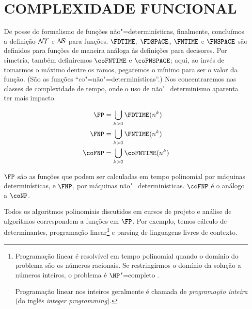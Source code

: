 \section{COMPLEXIDADE FUNCIONAL}
\label{sec:functional_complexity}

De posse do formalismo de funções não"=determinísticas,
finalmente,
concluímos a definição ${\mathcal{N\!T}}$ e ${\mathcal{N\!\!S}}$ para funções.
$\FDTIME$, $\FDSPACE$, $\FNTIME$ e $\FNSPACE$
são definidos para funções de maneira análoga às definições para decisores.
Por simetria, também definiremos $\coFNTIME$ e $\coFNSPACE$;
aqui, ao invés de tomarmos o máximo dentre os ramos,
pegaremos o mínimo para ser o valor da função.
(São as funções ``co"=não"=determinísticas''.)
Nos concentraremos nas classes de complexidade de tempo,
onde o uso de não"=determinismo aparenta ter mais impacto.

\begin{definition}
    \begin{align*}
        \FP &= \bigcup_{k > 0} \FDTIME(n^k) \\
        \FNP &= \bigcup_{k > 0} \FNTIME(n^k) \\
        \coFNP &= \bigcup_{k > 0} \coFNTIME(n^k)
    \end{align*}
\end{definition}

$\FP$ são as funções que podem ser calculadas
em tempo polinomial por máquinas determinísticas,
e $\FNP$, por máquinas não"=determinísticas.\footnotemark
$\coFNP$ é o análogo a $\coNP$.

\begin{example}
    Todos os algoritmos polinomiais
    discutidos em cursos de projeto e análise de algoritmos
    correspondem a funções em $\FP$.
    Por exemplo,
    temos cálculo de determinantes,
    programação linear\footnote{
        Programação linear é resolvível em tempo polinomial
        quando o domínio do problema são os números racionais.
        Se restringirmos o domínio da solução a números inteiros,
        o problema é $\NP$"=completo
        \cite[p.~202]{Papadimitriou1994}.

        Programação linear nos inteiros geralmente é chamada de
        \emph{programação inteira}
        (do inglês \emph{integer programming}).
    }
    e parsing de linguagens livres de contexto.
\end{example}

